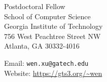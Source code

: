 \begin{minipage}[t]{0.45\textwidth}
  Postdoctoral Fellow\\
  School of Computer Science\\
  Georgia Institute of Technology\\
  756 West Peachtree Street NW\\
  Atlanta, GA 30332-4016
\end{minipage}
\begin{minipage}[t]{0.45\textwidth}
  Email: \texttt{wen.xu@gatech.edu} \\
  Website: \url{https://gts3.org/~wen}
\end{minipage}
